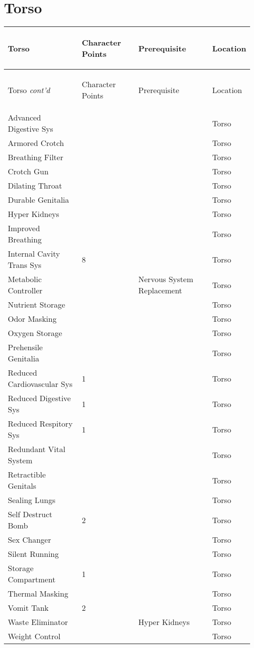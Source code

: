 \documentclass[twoside]{book}
\begin{document}
    

\section{Torso}
    
\begin{longtable}{p{1.25in}p{2em}ll} 
  Torso& \begin{turn}{70}{Character Points}\end{turn}
          & \begin{turn}{70}{Prerequisite}\end{turn}
          & \begin{turn}{70}{Location}\end{turn}
          \\
  \hline
  \hline
  \endfirsthead
  Torso \textit{cont'd}
        & \begin{turn}{70}{Character Points}\end{turn}
          & \begin{turn}{70}{Prerequisite}\end{turn}
          & \begin{turn}{70}{Location}\end{turn}
           \\
  \hline
  \endhead
\raggedright  Advanced Digestive Sys&&& Torso\tabularnewline
      \raggedright  Armored Crotch&&& Torso\tabularnewline
      \raggedright  Breathing Filter&&& Torso\tabularnewline
      \raggedright  Crotch Gun&&& Torso\tabularnewline
      \raggedright  Dilating Throat&&& Torso\tabularnewline
      \raggedright  Durable Genitalia&&& Torso\tabularnewline
      \raggedright  Hyper Kidneys&&& Torso\tabularnewline
      \raggedright  Improved Breathing&&& Torso\tabularnewline
      \raggedright  Internal Cavity Trans Sys& 8&& Torso\tabularnewline
      \raggedright  Metabolic Controller&& Nervous System
           Replacement& Torso\tabularnewline
      \raggedright  Nutrient Storage&&& Torso\tabularnewline
      \raggedright  Odor Masking&&& Torso\tabularnewline
      \raggedright  Oxygen Storage&&& Torso\tabularnewline
      \raggedright  Prehensile Genitalia&&& Torso\tabularnewline
      \raggedright  Reduced Cardiovascular Sys& 1&& Torso\tabularnewline
      \raggedright  Reduced Digestive Sys& 1&& Torso\tabularnewline
      \raggedright  Reduced Respitory Sys& 1&& Torso\tabularnewline
      \raggedright  Redundant Vital System&&& Torso\tabularnewline
      \raggedright  Retractible Genitals&&& Torso\tabularnewline
      \raggedright  Sealing Lungs&&& Torso\tabularnewline
      \raggedright  Self Destruct Bomb& 2&& Torso\tabularnewline
      \raggedright  Sex Changer&&& Torso\tabularnewline
      \raggedright  Silent Running&&& Torso\tabularnewline
      \raggedright  Storage Compartment& 1&& Torso\tabularnewline
      \raggedright  Thermal Masking&&& Torso\tabularnewline
      \raggedright  Vomit Tank& 2&& Torso\tabularnewline
      \raggedright  Waste Eliminator&& Hyper Kidneys& Torso\tabularnewline
      \raggedright  Weight Control&&& Torso\tabularnewline
      
\end{longtable}
    
\end{document}
